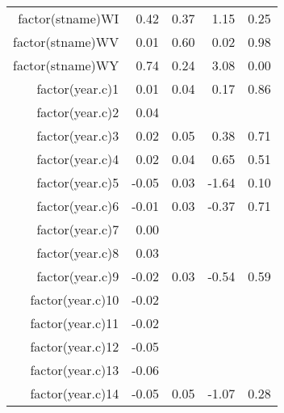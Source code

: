 \begin{table}[ht]
\begin{tabular}{rrrrr}
  factor(stname)WI & 0.42 & 0.37 & 1.15 & 0.25 \\ 
  factor(stname)WV & 0.01 & 0.60 & 0.02 & 0.98 \\ 
  factor(stname)WY & 0.74 & 0.24 & 3.08 & 0.00 \\ 
  factor(year.c)1 & 0.01 & 0.04 & 0.17 & 0.86 \\ 
  factor(year.c)2 & 0.04 &  &  &  \\ 
  factor(year.c)3 & 0.02 & 0.05 & 0.38 & 0.71 \\ 
  factor(year.c)4 & 0.02 & 0.04 & 0.65 & 0.51 \\ 
  factor(year.c)5 & -0.05 & 0.03 & -1.64 & 0.10 \\ 
  factor(year.c)6 & -0.01 & 0.03 & -0.37 & 0.71 \\ 
  factor(year.c)7 & 0.00 &  &  &  \\ 
  factor(year.c)8 & 0.03 &  &  &  \\ 
  factor(year.c)9 & -0.02 & 0.03 & -0.54 & 0.59 \\ 
  factor(year.c)10 & -0.02 &  &  &  \\ 
  factor(year.c)11 & -0.02 &  &  &  \\ 
  factor(year.c)12 & -0.05 &  &  &  \\ 
  factor(year.c)13 & -0.06 &  &  &  \\ 
  factor(year.c)14 & -0.05 & 0.05 & -1.07 & 0.28 \\ 
   \hline
\end{tabular}
\end{table}
